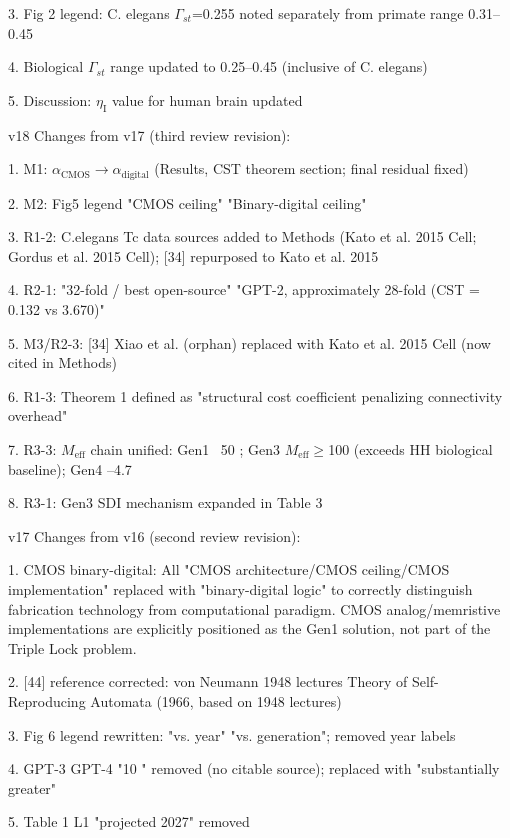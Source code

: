 \documentclass[a4paper,12pt]{article}
\begin{document}
3. Fig 2 legend: C. elegans $\Gamma_{st}$=0.255 noted separately from primate range 0.31--0.45

4. Biological $\Gamma_{st}$ range updated to 0.25--0.45 (inclusive of C. elegans)

5. Discussion: $\eta_{\text{I}}$ value for human brain updated

v18 Changes from v17 (third review revision):

1. M1: $\alpha_{\text{CMOS}} \rightarrow \alpha_{\text{digital}}$ (Results, CST theorem section; final residual fixed)

2. M2: Fig5 legend "CMOS ceiling"  \rightarrow  "Binary-digital ceiling"

3. R1-2: C.elegans Tc data sources added to Methods (Kato et al. 2015 Cell; Gordus et al. 2015 Cell); [34] repurposed to Kato et al. 2015

4. R2-1: "32-fold / best open-source"  \rightarrow  "GPT-2, approximately 28-fold (CST = 0.132 vs 3.670)"

5. M3/R2-3: [34] Xiao et al. (orphan) replaced with Kato et al. 2015 Cell (now cited in Methods)

6. R1-3: Theorem 1  \mu  defined as "structural cost coefficient penalizing connectivity overhead"

7. R3-3: $M_{\text{eff}}$ chain unified: Gen1 ~50 \rightarrow \alpha {}; Gen3 $M_{\text{eff}}\geq$100 \rightarrow \alpha {} (exceeds HH biological baseline); Gen4  --4.7

8. R3-1: Gen3 SDI mechanism expanded in Table 3

v17 Changes from v16 (second review revision):

1. CMOS \rightarrow binary-digital: All "CMOS architecture/CMOS ceiling/CMOS implementation" replaced with "binary-digital logic" to correctly distinguish fabrication technology from computational paradigm. CMOS analog/memristive implementations are explicitly positioned as the Gen1 solution, not part of the Triple Lock problem.

2. [44] reference corrected: von Neumann 1948 lectures  \rightarrow  Theory of Self-Reproducing Automata (1966, based on 1948 lectures)

3. Fig 6 legend rewritten: "vs. year"  \rightarrow  "vs. generation"; removed year labels

4. GPT-3 \rightarrow GPT-4 "10 \times " removed (no citable source); replaced with "substantially greater"

5. Table 1 L1 "projected 2027" removed
\end{document}
